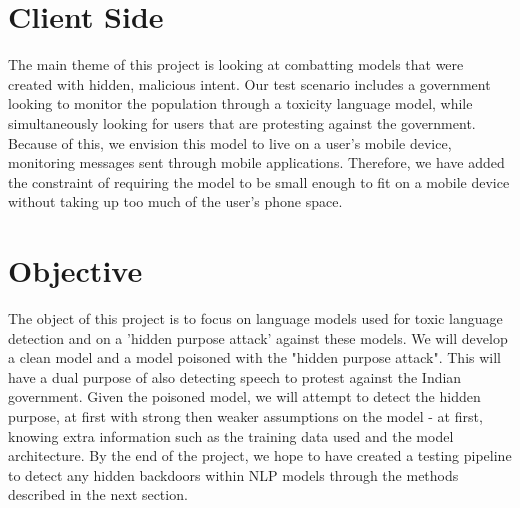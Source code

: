 \section{Client Side}

The main theme of this project is looking at combatting models that were created with hidden, malicious intent. Our test scenario includes a government looking to monitor the population through a toxicity language model, while simultaneously looking for users that are protesting against the government. Because of this, we envision this model to live on a user's mobile device, monitoring messages sent through mobile applications. Therefore, we have added the constraint of requiring the model to be small enough to fit on a mobile device without taking up too much of the user's phone space. 

\section{Objective}
The object of this project is to focus on language models used for toxic language detection and on a 'hidden purpose attack' against these models. We will develop a clean model and a model poisoned with the "hidden purpose attack". This will have a dual purpose of also detecting speech to protest against the Indian government. Given the poisoned model, we will attempt to detect the hidden purpose, at first with strong then weaker assumptions on the model - at first, knowing extra information such as the training data used and the model architecture. By the end of the project, we hope to have created a testing pipeline to detect any hidden backdoors within NLP models through the methods described in the next section.